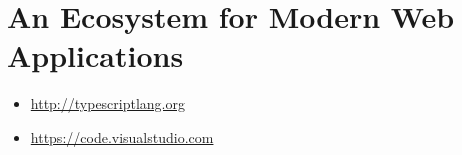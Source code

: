 \section{An Ecosystem for Modern Web Applications}




\begin{itemize}
  \item \url{http://typescriptlang.org}
\end{itemize}


\begin{itemize}
  \item \url{https://code.visualstudio.com}
\end{itemize}



